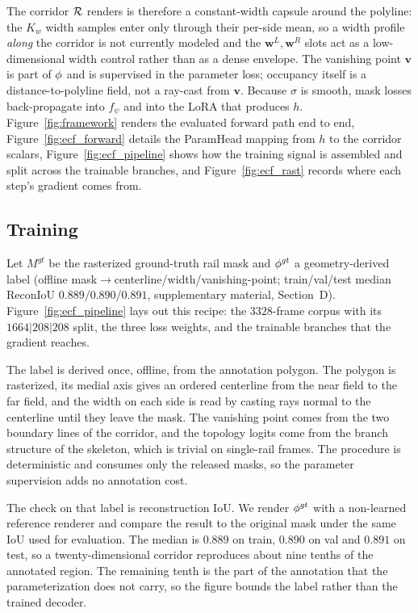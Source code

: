 The corridor $\mathcal{R}$ renders is therefore a constant-width capsule around the polyline: the $K_w$ width samples enter only through their per-side mean, so a width profile \emph{along} the corridor is not currently modeled and the $\mathbf{w}^{L},\mathbf{w}^{R}$ slots act as a low-dimensional width control rather than as a dense envelope.
The vanishing point $\mathbf{v}$ is part of $\phi$ and is supervised in the parameter loss; occupancy itself is a distance-to-polyline field, not a ray-cast from $\mathbf{v}$.
Because $\sigma$ is smooth, mask losses back-propagate into $f_\psi$ and into the LoRA that produces $h$.
Figure~\ref{fig:framework} renders the evaluated forward path end to end, Figure~\ref{fig:ecf_forward} details the ParamHead mapping from $h$ to the corridor scalars, Figure~\ref{fig:ecf_pipeline} shows how the training signal is assembled and split across the trainable branches, and Figure~\ref{fig:ecf_rast} records where each step's gradient comes from.

\subsection{Training}
\label{sec:train}

Let $M^{gt}$ be the rasterized ground-truth rail mask and $\phi^{gt}$ a geometry-derived label (offline mask$\to$centerline/width/vanishing-point; train/val/test median ReconIoU $0.889/0.890/0.891$, supplementary material, Section~D).
Figure~\ref{fig:ecf_pipeline} lays out this recipe: the $3328$-frame corpus with its $1664|208|208$ split, the three loss weights, and the trainable branches that the gradient reaches.

The label is derived once, offline, from the annotation polygon. The polygon is rasterized, its medial axis gives an ordered centerline from the near field to the far field, and the width on each side is read by casting rays normal to the centerline until they leave the mask. The vanishing point comes from the two boundary lines of the corridor, and the topology logits come from the branch structure of the skeleton, which is trivial on single-rail frames. The procedure is deterministic and consumes only the released masks, so the parameter supervision adds no annotation cost.

The check on that label is reconstruction IoU. We render $\phi^{gt}$ with a non-learned reference renderer and compare the result to the original mask under the same IoU used for evaluation. The median is $0.889$ on train, $0.890$ on val and $0.891$ on test, so a twenty-dimensional corridor reproduces about nine tenths of the annotated region. The remaining tenth is the part of the annotation that the parameterization does not carry, so the figure bounds the label rather than the trained decoder.

